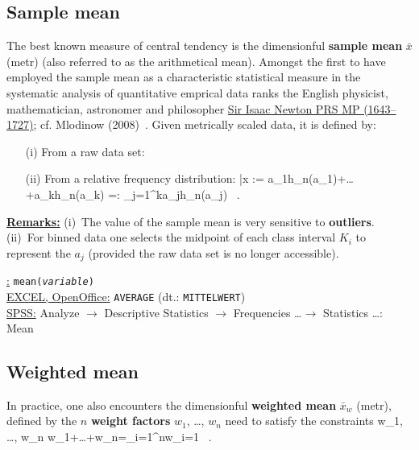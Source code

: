 \subsection[Sample mean]{Sample mean}
The best known measure of central tendency is the dimensionful
\textbf{sample mean} $\bar{x}$ (metr) (also referred to as the 
arithmetical mean). Amongst the first to have employed the sample 
mean as a characteristic statistical measure in the systematic 
analysis of quantitative emprical data ranks the English 
physicist, mathematician, astronomer and philosopher
\href{http://www-history.mcs.st-and.ac.uk/Biographies/Newton.html}{Sir
Isaac Newton PRS MP (1643--1727)}; cf. Mlodinow 
(2008)~. Given metrically scaled data, it is 
defined by:
%
\begin{itemize}
\item[(i)] From a raw data set:
%
\be
{}
\ee
%
\item[(ii)] From a relative frequency distribution:
%
\be
\bar{x}
:= a_{1}h_{n}(a_{1})+\ldots+a_{k}h_{n}(a_{k})
=: \sum_{j=1}^{k}a_{j}h_{n}(a_{j}) \ .
\ee
%
\end{itemize}
%

\medskip
\noindent
\underline{\textbf{Remarks:}} (i)~The value of the sample mean is
very sensitive to \textbf{outliers}.\\ (ii)~For binned data one
selects the midpoint of each class interval $K_{i}$ to represent
the $a_{j}$ (provided the raw data set is no longer accessible).

\medskip
\noindent
\underline{\R:} \texttt{mean(\textit{variable})} \\
\underline{EXCEL, OpenOffice:} \texttt{AVERAGE} (dt.:
\texttt{MITTELWERT}) \\
\underline{SPSS:} Analyze $\rightarrow$ Descriptive Statistics
$\rightarrow$ Frequencies \ldots $\rightarrow$ Statistics
\ldots: Mean


\subsection[Weighted mean]{Weighted mean}
In practice, one also encounters the dimensionful \textbf{weighted 
mean} $\bar{x}_{w}$ (metr), defined by
%
\be
{}
\ee
%
the $n$ \textbf{weight factors} $w_{1}$, \ldots, $w_{n}$ need to 
satisfy the constraints
%
 \leq w_{1}, \ldots, w_{n} 
\quad {} \quad
w_{1}+\ldots+w_{n}=\sum_{i=1}^{n}w_{i}=1 \ .
\ee
%

